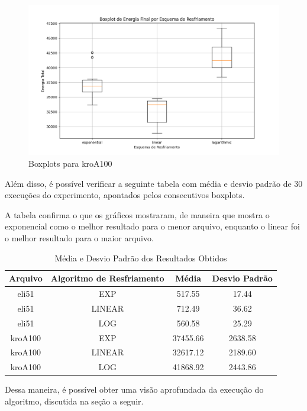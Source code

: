 \documentclass[12pt]{article}
\begin{document}
\begin{figure}[H]
  \centering
  \includegraphics[width=.9\textwidth]{imgs/boxplot_100 copy.png}
  \caption{Boxplots para kroA100}
  \label{fig:boxplot100}
\end{figure}

Além disso, é possível verificar a seguinte tabela com média e desvio padrão de 30 execuções do experimento, apontados pelos consecutivos boxplots.

A tabela confirma o que os gráficos mostraram, de maneira que mostra o exponencial como o melhor resultado para o menor arquivo, enquanto o linear foi o melhor resultado para o maior arquivo.

\begin{table}[H]
\centering
\caption{Média e Desvio Padrão dos Resultados Obtidos}
\begin{tabular}{|c|c|c|c|}
\hline
\textbf{Arquivo} & \textbf{Algoritmo de Resfriamento} & \textbf{Média} & \textbf{Desvio Padrão} \\ \hline
eli51     & EXP     & 517.55      & 17.44 \\ \hline
eli51     & LINEAR  & 712.49      & 36.62 \\ \hline
eli51     & LOG     & 560.58      & 25.29 \\ \hline
kroA100   & EXP     & 37455.66    & 2638.58 \\ \hline
kroA100   & LINEAR  & 32617.12    & 2189.60 \\ \hline
kroA100   & LOG     & 41868.92    & 2443.86 \\ \hline


\end{tabular}
\label{tab:resultados}
\end{table}


Dessa maneira, é possível obter uma visão aprofundada da execução do algoritmo, discutida na seção a seguir.
\end{document}
